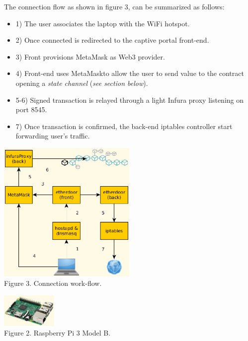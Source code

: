\documentclass[12pt]{amsart}
\begin{document}
\begin{multicols}{2}
\vspace{0.35cm}

The connection flow as shown in figure 3, can be summarized
as follows:

\begin{itemize}
\item[] 1) The user associates the laptop with the WiFi hotspot.
\item[] 2) Once connected is redirected to the captive portal front-end.
\item[] 3) Front provisions MetaMask as Web3 provider.
\item[] 4) Front-end uses MetaMaskto allow the user
  to send value to the contract opening a \textit{state channel} 
(\textit{see section below}).
\item[] 5-6) Signed transaction is relayed through a light Infura proxy listening
  on port 8545.
\item[] 7) Once transaction is confirmed, the back-end iptables controller
  start forwarding user's traffic.
\end{itemize}

\begin{center}
  \includegraphics[keepaspectratio, width=0.5\textwidth]{images/con-flow-y.eps}
\\
Figure 3. Connection work-flow.
\\
\end{center}

\begin{center}
  \includegraphics[keepaspectratio, width=0.2\textwidth]{images/rpi3modelb-sourceamazon.eps}
\\
Figure 2. Raspberry Pi 3 Model B.
\\
\end{center}







\end{multicols}
\end{document}
